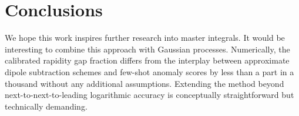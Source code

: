 \section{Conclusions}\label{sec:conclusions}

We hope this work inspires further research into master integrals. It
would be interesting to combine this approach with Gaussian processes.
Numerically, the calibrated rapidity gap fraction differs from the
interplay between approximate dipole subtraction schemes and few-shot
anomaly scores by less than a part in a thousand without any additional
assumptions. Extending the method beyond next-to-next-to-leading
logarithmic accuracy is conceptually straightforward but technically
demanding.


